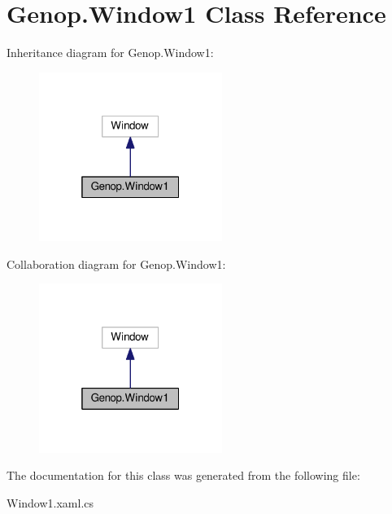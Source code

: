 \hypertarget{classGenop_1_1Window1}{}\section{Genop.\+Window1 Class Reference}
\label{classGenop_1_1Window1}


Inheritance diagram for Genop.\+Window1\+:
\nopagebreak
\begin{figure}[H]
\begin{center}
\leavevmode
\includegraphics[width=169pt]{classGenop_1_1Window1__inherit__graph}
\end{center}
\end{figure}


Collaboration diagram for Genop.\+Window1\+:
\nopagebreak
\begin{figure}[H]
\begin{center}
\leavevmode
\includegraphics[width=169pt]{classGenop_1_1Window1__coll__graph}
\end{center}
\end{figure}


The documentation for this class was generated from the following file\+:\begin{DoxyCompactItemize}
\item 
Window1.\+xaml.\+cs\end{DoxyCompactItemize}
